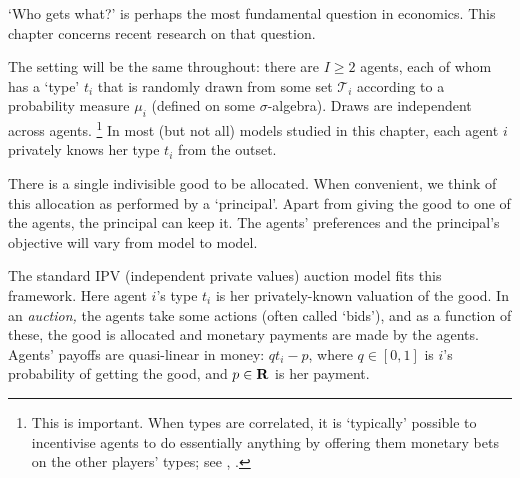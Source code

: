 






`Who gets what?' is perhaps the most fundamental question in economics.
This chapter concerns recent research on that question.

The setting will be the same throughout: there are $I \geq 2$ agents, each of whom has a `type' $t_i$ that is randomly drawn from some set $\mathcal{T}_i$
according to a probability measure $\mu_i$
(defined on some $\sigma$-algebra).
Draws are independent across agents.%
	\footnote{This is important. When types are correlated, it is `typically' possible to incentivise agents to do essentially anything by offering them monetary bets on the other players' types; see \textcite[§7]{Myerson1981}, \textcite{CremerMclean1988,McafeeReny1992}.}
In most (but not all) models studied in this chapter, each agent $i$ privately knows her type $t_i$ from the outset.

There is a single indivisible good to be allocated.
When convenient, we think of this allocation as performed by a `principal'.
Apart from giving the good to one of the agents, the principal can keep it.
The agents' preferences and the principal's objective will vary from model to model.

The standard IPV (independent private values) auction model fits this framework.
Here agent $i$'s type $t_i$ is her privately-known valuation of the good.
In an \emph{auction,} the agents take some actions (often called `bids'),
and as a function of these, the good is allocated and monetary payments are made by the agents.
Agents' payoffs are quasi-linear in money: $q t_i - p$, where $q \in [0,1]$ is $i$'s probability of getting the good, and $p \in \mathbf{R}$ is her payment.


